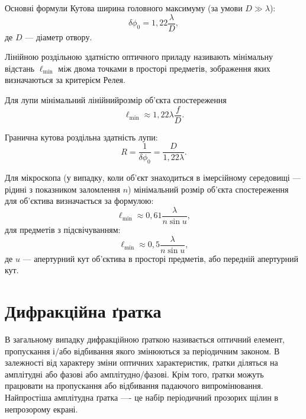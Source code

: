 \begin{Theory}{Основні формули}
    Кутова ширина головного максимуму (за умови $D \gg \lambda$):
    \begin{equation}\label{eq:Difraction_Hole_min}
        \delta\phi_0 = 1,22\frac{\lambda}{D},
    \end{equation}
    де $D$ --- діаметр отвору.

    Лінійною роздільною здатністю оптичного приладу називають мінімальну відстань $\ell_{\min}$ між двома точками в просторі предметів, зображення яких визначаються за критерієм Релея.

    Для лупи мінімальний лінійнийрозмір об'єкта спостереження
    \begin{equation}\label{eq:Difraction_linear_R}
        \ell_{\min} \approx 1,22 \lambda\frac{f}{D}.
    \end{equation}

    Гранична кутова роздільна здатність лупи:
    \begin{equation}\label{eq:Difraction_R}
        R = \frac{1}{\delta\phi_0} = \frac{D}{1,22 \lambda}.
    \end{equation}


    Для мікроскопа (у випадку, коли об'єкт знаходиться в імерсійному
    середовищі --- рідині з показником заломлення $n$) мінімальний розмір об'єкта спостереження для об'єктива визначається за формулою:
    \begin{equation}\label{eq:Difraction_immers}
        \ell_{\min} \approx 0,61 \frac{\lambda}{n\sin u},
    \end{equation}
    для предметів з підсвічуванням:
    \begin{equation}\label{eq:Difraction_immers}
        \ell_{\min} \approx 0,5 \frac{\lambda}{n\sin u},
    \end{equation}
    де $u$ ---  апертурний кут об'єктива в просторі предметів, або передній апертурний кут.
\end{Theory}






\section{Дифракційна ґратка}

В загальному випадку дифракційною ґраткою називається оптичний елемент, пропускання і/або відбивання якого змінюються за періодичним законом. В залежності від характеру зміни оптичних характеристик, ґратки діляться на амплітудні або фазові або амплітудно/фазові. Крім того, ґратки можуть працювати на пропускання або відбивання падаючого випромінювання. Найпростіша амплітудна ґратка ---- це набір періодичний прозорих щілин в непрозорому екрані.


